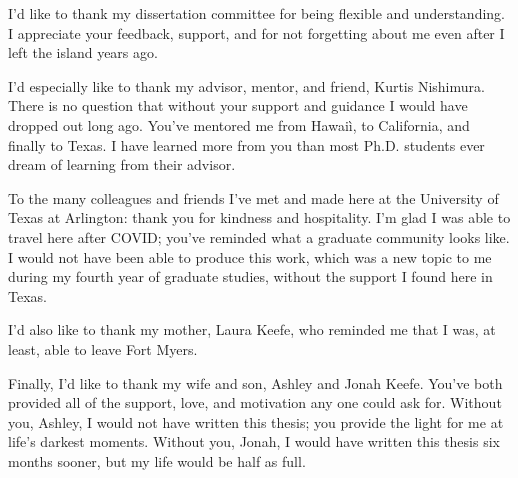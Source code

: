 \documentclass[12pt]{uh_thesis}
\begin{document}
\begin{acknowledgements}

    I'd like to thank my dissertation committee for being flexible and understanding.
    I appreciate your feedback, support, and for not forgetting about me even after I left the island years ago.

    I'd especially like to thank my advisor, mentor, and friend, Kurtis Nishimura.
    There is no question that without your support and guidance I would have dropped out long ago.
    You've mentored me from Hawai\`i, to California, and finally to Texas.
    I have learned more from you than most Ph.D. students ever dream of learning from their advisor.

    To the many colleagues and friends I've met and made here at the University of Texas at Arlington: thank you for kindness and hospitality.
    I'm glad I was able to travel here after COVID; you've reminded what a graduate community looks like.
    I would not have been able to produce this work, which was a new topic to me during my fourth year of graduate studies, without the support I found here in Texas.

    I'd also like to thank my mother, Laura Keefe, who reminded me that I was, at least, able to leave Fort Myers.

    Finally, I'd like to thank my wife and son, Ashley and Jonah Keefe.
    You've both provided all of the support, love, and motivation any one could ask for.
    Without you, Ashley, I would not have written this thesis; you provide the light for me at life's darkest moments.
    Without you, Jonah, I would have written this thesis six months sooner, but my life would be half as full.

\end{acknowledgements}
\end{document}
